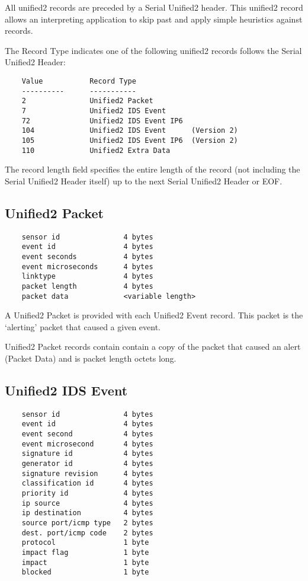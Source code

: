 \documentclass[english]{report}
\begin{document}
  All unified2 records are preceded by a Serial Unified2 header.  This
  unified2 record allows an interpreting application to skip past and
  apply simple heuristics against records.
  
  The Record Type indicates one of the following unified2 records
  follows the Serial Unified2 Header:

\begin{verbatim}
    Value           Record Type
    ----------      -----------
    2               Unified2 Packet
    7               Unified2 IDS Event
    72              Unified2 IDS Event IP6
    104             Unified2 IDS Event      (Version 2)
    105             Unified2 IDS Event IP6  (Version 2)
    110             Unified2 Extra Data
\end{verbatim}

  The record length field specifies the entire length of the record 
  (not including the Serial Unified2 Header itself) up to the next 
  Serial Unified2 Header or EOF.

\subsection{Unified2 Packet}
    
\begin{verbatim}
    sensor id               4 bytes
    event id                4 bytes
    event seconds           4 bytes
    event microseconds      4 bytes
    linktype                4 bytes
    packet length           4 bytes
    packet data             <variable length>
\end{verbatim}

  A Unified2 Packet is provided with each Unified2 Event record. This
  packet is the `alerting' packet that caused a given event.

  Unified2 Packet records contain contain a copy of the packet that
  caused an alert (Packet Data) and is packet length octets long.

\subsection{Unified2 IDS Event}

\begin{verbatim}
    sensor id               4 bytes
    event id                4 bytes
    event second            4 bytes
    event microsecond       4 bytes
    signature id            4 bytes
    generator id            4 bytes
    signature revision      4 bytes
    classification id       4 bytes
    priority id             4 bytes
    ip source               4 bytes
    ip destination          4 bytes
    source port/icmp type   2 bytes
    dest. port/icmp code    2 bytes
    protocol                1 byte
    impact flag             1 byte
    impact                  1 byte
    blocked                 1 byte
\end{verbatim}
\end{document}
